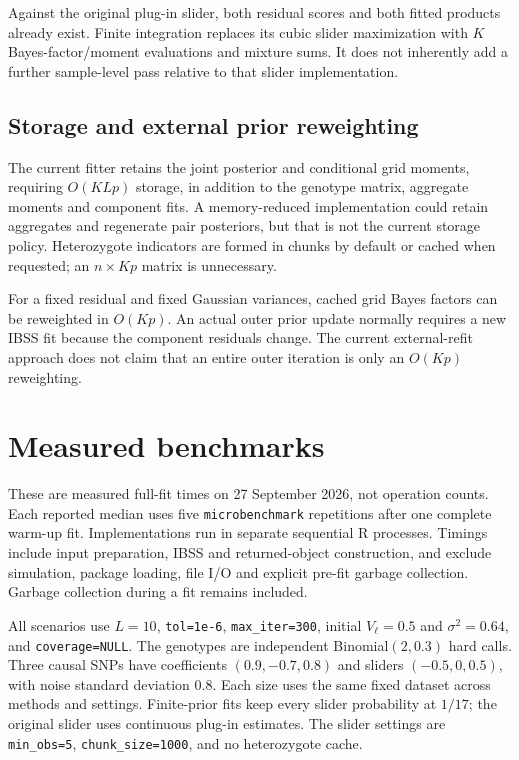 \documentclass[11pt]{article}
\begin{document}
Against the original plug-in slider, both residual scores and both fitted
products already exist. Finite integration replaces its cubic slider
maximization with $K$ Bayes-factor/moment evaluations and mixture sums.
It does not inherently add a further sample-level pass relative to that
slider implementation.

\subsection{Storage and external prior reweighting}
The current fitter retains the joint posterior and conditional grid
moments, requiring $O(KLp)$ storage, in addition to the genotype matrix,
aggregate moments and component fits. A memory-reduced implementation
could retain aggregates and regenerate pair posteriors, but that is not
the current storage policy. Heterozygote indicators are formed in chunks
by default or cached when requested; an $n\times Kp$ matrix is unnecessary.

For a fixed residual and fixed Gaussian variances, cached grid Bayes
factors can be reweighted in $O(Kp)$. An actual outer prior update normally
requires a new IBSS fit because the component residuals change.
The current external-refit approach does not claim that an entire
outer iteration is only an $O(Kp)$ reweighting.

\section{Measured benchmarks}
\label{sec:bench}
These are measured full-fit times on 27 September 2026, not operation
counts. Each reported median uses five \texttt{microbenchmark} repetitions
after one complete warm-up fit. Implementations run in separate sequential
R processes. Timings include input preparation, IBSS and returned-object
construction, and exclude simulation, package loading, file I/O and
explicit pre-fit garbage collection. Garbage collection during a fit
remains included.

All scenarios use $L=10$, \texttt{tol=1e-6}, \texttt{max\_iter=300},
initial $V_\ell=0.5$ and $\sigma^2=0.64$, and \texttt{coverage=NULL}.
The genotypes are independent Binomial$(2,0.3)$ hard calls. Three causal
SNPs have coefficients $(0.9,-0.7,0.8)$ and sliders $(-0.5,0,0.5)$,
with noise standard deviation $0.8$. Each size uses the same fixed
dataset across methods and settings. Finite-prior fits keep every slider
probability at $1/17$; the original slider uses continuous plug-in estimates.
The slider settings are \texttt{min\_obs=5},
\texttt{chunk\_size=1000}, and no heterozygote cache.
\end{document}

